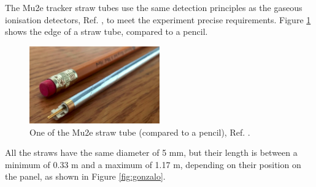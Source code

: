 The Mu2e tracker straw tubes use the same detection principles as the gaseous 
ionisation detectors, Ref. \cite{kolaimprov}, to 
meet the experiment precise requirements.
Figure \ref{fig:trkpencil} shows the edge of a straw tube, compared to a pencil.
\begin{figure}[!h]
    \centering
    \includegraphics[width =0.5\textwidth]{figures/png/Screenshot_20240327_000000.png}
    \caption[A Mu2e straw tube.]{One of the Mu2e straw tube (compared to a pencil), Ref. \cite{trk}.}
    \label{fig:trkpencil}
    \end{figure}


All the straws have the same diameter of 5 mm, but their length 
is between a minimum of 0.33 m and a maximum of 1.17 m, 
depending on their position on the panel, as shown in Figure \ref{fig:gonzalo}.


